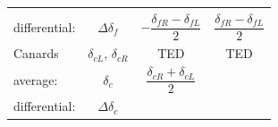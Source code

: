 \documentclass[
]{book}
\begin{document}
\begin{longtable}[]{@{}lccc@{}}
\begin{minipage}[t]{0.29\columnwidth}
\end{minipage} & \begin{minipage}[t]{0.27\columnwidth}\centering
\strut
\end{minipage}\tabularnewline
\begin{minipage}[t]{0.19\columnwidth}\raggedright
differential:\strut
\end{minipage} & \begin{minipage}[t]{0.14\columnwidth}\centering
\(\Delta\delta_f\)\strut
\end{minipage} & \begin{minipage}[t]{0.29\columnwidth}\centering
\[-\frac{\delta_{fR} - \delta_{fL}}{2}\]\strut
\end{minipage} & \begin{minipage}[t]{0.27\columnwidth}\centering
\[\frac{\delta_{fR} - \delta_{fL}}{2}\]\strut
\end{minipage}\tabularnewline
\begin{minipage}[t]{0.19\columnwidth}\raggedright
Canards\strut
\end{minipage} & \begin{minipage}[t]{0.14\columnwidth}\centering
\(\delta_{cL}\),
\(\delta_{cR}\)\strut
\end{minipage} & \begin{minipage}[t]{0.29\columnwidth}\centering
TED\strut
\end{minipage} & \begin{minipage}[t]{0.27\columnwidth}\centering
TED\strut
\end{minipage}\tabularnewline
\begin{minipage}[t]{0.19\columnwidth}\raggedright
average:\strut
\end{minipage} & \begin{minipage}[t]{0.14\columnwidth}\centering
\(\delta_c\)\strut
\end{minipage} & \begin{minipage}[t]{0.29\columnwidth}\centering
\[\frac{\delta_{cR} + \delta_{cL}}{2}\]\strut
\end{minipage} & \begin{minipage}[t]{0.27\columnwidth}\centering
\strut
\end{minipage}\tabularnewline
\begin{minipage}[t]{0.19\columnwidth}\raggedright
differential:\strut
\end{minipage} & \begin{minipage}[t]{0.14\columnwidth}\centering
\(\Delta\delta_c\)\strut
\end{minipage} & \begin{minipage}[t]{0.29\columnwidth}\centering

\end{minipage}
\end{longtable}
\end{document}
